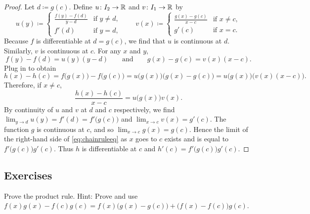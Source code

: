 \begin{proof}
Let $d \coloneqq g(c)$.  Define
$u \colon I_2 \to {\mathbb{R}}$ and $v \colon I_1 \to {\mathbb{R}}$ by
\begin{equation*}
u(y) \coloneqq
\begin{cases}
 \frac{f(y) - f(d)}{y-d}  & \text{if } y \not=d, \\
 f'(d)                    & \text{if } y = d,
\end{cases}
\qquad
v(x) \coloneqq
\begin{cases}
 \frac{g(x) - g(c)}{x-c} & \text{if } x \not=c, \\
 g'(c)                   & \text{if } x = c.
\end{cases}
\end{equation*}
Because $f$ is differentiable at $d = g(c)$, we find that
$u$ is continuous at $d$.  Similarly, $v$ is continuous at $c$.
For any $x$ and $y$,
\begin{equation*}
f(y)-f(d) = u(y) (y-d)
\qquad \text{and} \qquad
g(x)-g(c) = v(x) (x-c) .
\end{equation*}
Plug in to obtain
\begin{equation*}
h(x)-h(c)
=
f\bigl(g(x)\bigr)-f\bigl(g(c)\bigr)
=
u\bigl( g(x) \bigr) \bigl(g(x)-g(c)\bigr)
=
u\bigl( g(x) \bigr) \bigl(v(x) (x-c)\bigr) .
\end{equation*}
Therefore, if $x \not= c$,
\begin{equation} \label{eq:chainruleeq}
\frac{h(x)-h(c)}{x-c}
=
u\bigl( g(x) \bigr) v(x) .
\end{equation}
By continuity of $u$ and $v$ at $d$ and $c$ respectively, we find
$\lim_{y \to d} u(y)
= f'(d) = f'\bigl(g(c)\bigr)$ and
$\lim_{x \to c} v(x) = g'(c)$.
The function $g$ is continuous at $c$, and so $\lim_{x \to c} g(x) = g(c)$.
Hence the limit of
the right-hand side of \eqref{eq:chainruleeq}
as $x$ goes to $c$
exists and is equal to $f'\bigl(g(c)\bigr) g'(c)$.  Thus $h$
is differentiable at $c$ and $h'(c) = f'\bigl(g(c)\bigr)g'(c)$.
\end{proof}

\subsection{Exercises}

\begin{exercise}
Prove the product rule.
Hint: Prove and use
$f(x) g(x) - f(c) g(c) = f(x)\bigl( g(x) - g(c) \bigr) + \bigl( f(x) -
f(c) \bigr) g(c)$.
\end{exercise}

